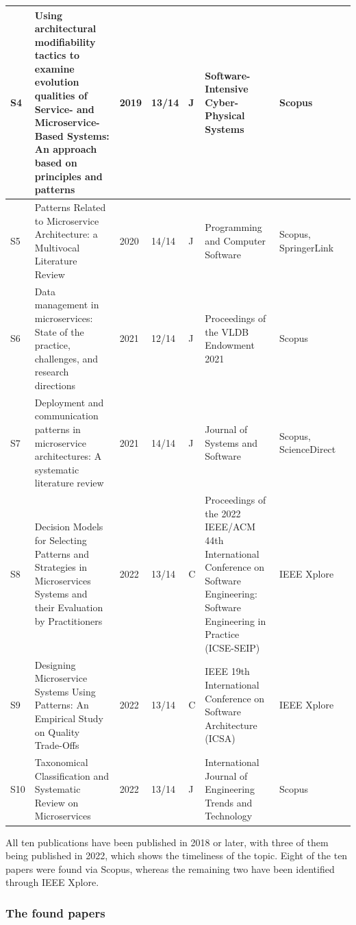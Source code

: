\documentclass{bmcart}
\begin{document}
\begin{table}[!ht]
\begin{tabular}{|p{0.3cm}|p{4cm}|p{0.7cm}|p{0.8cm}|p{0.5cm}|p{2cm}|p{1cm}|p{0.5cm}|}
      \hline  
      S4 & Using architectural modifiability tactics to examine evolution qualities of Service- and Microservice-Based Systems: An approach based on principles and patterns & 2019 & 13/14 & J & Software-Intensive Cyber-Physical Systems & Scopus & \cite{Bogner.2019} \\ 
      \hline   
      S5 & Patterns Related to Microservice Architecture: a Multivocal Literature Review & 2020 & 14/14 & J & Programming and Computer Software & Scopus, SpringerLink & \cite{Valdivia.2020}  \\ 
      \hline
      S6 & Data management in microservices: State of the practice, challenges, and research directions & 2021 & 12/14 & J & Proceedings of the VLDB Endowment 2021 & Scopus & \cite{Laigner.2021}  \\ 
      \hline
      S7 & Deployment and communication patterns in microservice architectures: A systematic literature review & 2021 & 14/14 & J & Journal of Systems and Software & Scopus, ScienceDirect & \cite{aksakalli2021deployment}  \\ 
      \hline
      S8 & Decision Models for Selecting Patterns and Strategies in Microservices Systems and their Evaluation by Practitioners & 2022 & 13/14 & C & Proceedings of the 2022 IEEE/ACM 44th International Conference on Software Engineering: Software Engineering in Practice (ICSE-SEIP) & IEEE Xplore & \cite{Waseem.2022} \\ 
      \hline
      S9 & Designing Microservice Systems Using Patterns: An Empirical Study on Quality Trade-Offs & 2022 & 13/14 & C & IEEE 19th International Conference on Software Architecture (ICSA) & IEEE Xplore & \cite{Vale.2022} \\ 
      \hline
      S10 & Taxonomical Classification and Systematic Review on Microservices & 2022 & 13/14 & J & International Journal of Engineering Trends and Technology & Scopus & \cite{Weerasinghe.2022}  \\ 
      \hline
  \end{tabular}
  \label{finalLiterature}
\end{table}

All ten publications have been published in 2018 or later, with three of them being published in 2022, which shows the timeliness of the topic. Eight of the ten papers were found via Scopus, whereas the remaining two have been identified through IEEE Xplore. 




\subsubsection{The found papers}
\end{document}
